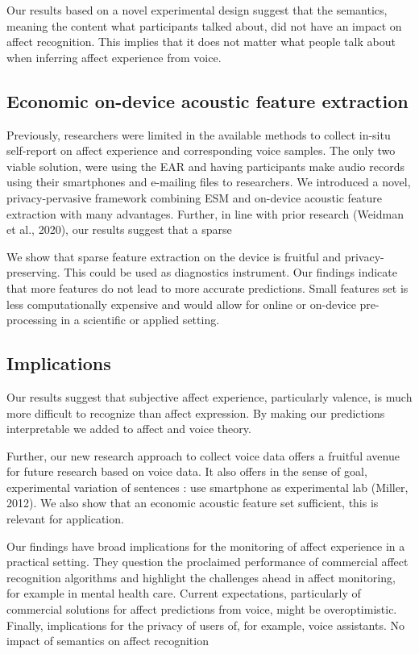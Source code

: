 \documentclass[
  english,
  man,floatsintext]{apa6}
\begin{document}
Our results based on a novel experimental design suggest that the semantics, meaning the content what participants talked about, did not have an impact on affect recognition. This implies that it does not matter what people talk about when inferring affect experience from voice.

\hypertarget{economic-on-device-acoustic-feature-extraction}{%
\subsection{Economic on-device acoustic feature extraction}\label{economic-on-device-acoustic-feature-extraction}}

Previously, researchers were limited in the available methods to collect in-situ self-report on affect experience and corresponding voice samples. The only two viable solution, were using the EAR and having participants make audio records using their smartphones and e-mailing files to researchers. We introduced a novel, privacy-pervasive framework combining ESM and on-device acoustic feature extraction with many advantages. Further, in line with prior research (Weidman et al., 2020), our results suggest that a sparse

We show that sparse feature extraction on the device is fruitful and privacy-preserving. This could be used as diagnostics instrument. Our findings indicate that more features do not lead to more accurate predictions. Small features set is less computationally expensive and would allow for online or on-device pre-processing in a scientific or applied setting.

\hypertarget{implications}{%
\subsection{Implications}\label{implications}}

Our results suggest that subjective affect experience, particularly valence, is much more difficult to recognize than affect expression. By making our predictions interpretable we added to affect and voice theory.

Further, our new research approach to collect voice data offers a fruitful avenue for future research based on voice data. It also offers in the sense of goal, experimental variation of sentences : use smartphone as experimental lab (Miller, 2012). We also show that an economic acoustic feature set sufficient, this is relevant for application.

Our findings have broad implications for the monitoring of affect experience in a practical setting. They question the proclaimed performance of commercial affect recognition algorithms and highlight the challenges ahead in affect monitoring, for example in mental health care. Current expectations, particularly of commercial solutions for affect predictions from voice, might be overoptimistic. Finally, implications for the privacy of users of, for example, voice assistants. No impact of semantics on affect recognition
\end{document}
